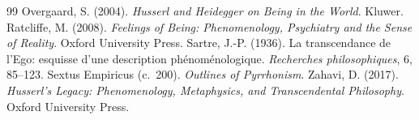 \documentclass{situationist-preprint}
\begin{document}
\begin{thebibliography}{99}
 Overgaard, S. (2004). \emph{Husserl and Heidegger on Being in the World}. Kluwer.
 Ratcliffe, M. (2008). \emph{Feelings of Being: Phenomenology, Psychiatry and the Sense of Reality}. Oxford University Press.
 Sartre, J.-P. (1936). La transcendance de l'Ego: esquisse d'une description phénoménologique. \emph{Recherches philosophiques}, 6, 85--123.
 Sextus Empiricus (c.~200). \emph{Outlines of Pyrrhonism}.
 Zahavi, D. (2017). \emph{Husserl's Legacy: Phenomenology, Metaphysics, and Transcendental Philosophy}. Oxford University Press.
\end{thebibliography}
\end{document}
